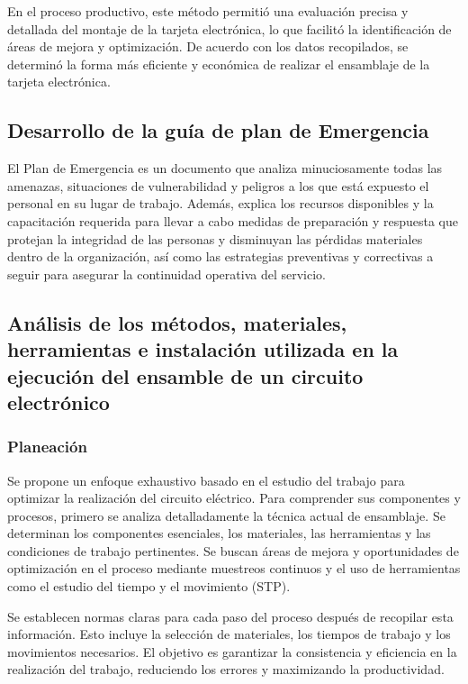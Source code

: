     En el proceso productivo, este método permitió una evaluación precisa y detallada del montaje de la tarjeta electrónica, lo que facilitó la identificación de áreas de mejora y optimización. De acuerdo con los datos recopilados, se determinó la forma más eficiente y económica de realizar el ensamblaje de la tarjeta electrónica.
    \subsection{Desarrollo de la guía de plan de Emergencia}
    
    El Plan de Emergencia es un documento que analiza minuciosamente todas las amenazas, situaciones de vulnerabilidad y peligros a los que está expuesto el personal en su lugar de trabajo. Además, explica los recursos disponibles y la capacitación requerida para llevar a cabo medidas de preparación y respuesta que protejan la integridad de las personas y disminuyan las pérdidas materiales dentro de la organización, así como las estrategias preventivas y correctivas a seguir para asegurar la continuidad operativa del servicio.
    \subsection{Análisis de los métodos, materiales, herramientas e instalación utilizada en la ejecución del ensamble de un circuito electrónico}
    
    \subsubsection{Planeación}
    
    Se propone un enfoque exhaustivo basado en el estudio del trabajo para optimizar la realización del circuito eléctrico. Para comprender sus componentes y procesos, primero se analiza detalladamente la técnica actual de ensamblaje. Se determinan los componentes esenciales, los materiales, las herramientas y las condiciones de trabajo pertinentes. Se buscan áreas de mejora y oportunidades de optimización en el proceso mediante muestreos continuos y el uso de herramientas como el estudio del tiempo y el movimiento (STP).
    
    Se establecen normas claras para cada paso del proceso después de recopilar esta información. Esto incluye la selección de materiales, los tiempos de trabajo y los movimientos necesarios. El objetivo es garantizar la consistencia y eficiencia en la realización del trabajo, reduciendo los errores y maximizando la productividad.
    
